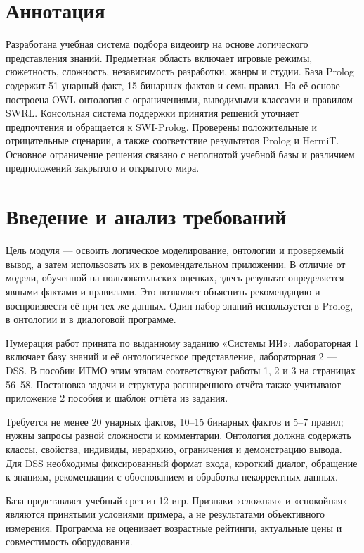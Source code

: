 \section{Аннотация}
Разработана учебная система подбора видеоигр на основе логического представления знаний.
Предметная область включает игровые режимы, сюжетность, сложность, независимость разработки,
жанры и студии. База Prolog содержит 51 унарный факт, 15 бинарных фактов и семь правил.
На её основе построена OWL-онтология с ограничениями, выводимыми классами и правилом SWRL.
Консольная система поддержки принятия решений уточняет предпочтения и обращается к SWI-Prolog.
Проверены положительные и отрицательные сценарии, а также соответствие результатов Prolog и HermiT.
Основное ограничение решения связано с неполнотой учебной базы и различием предположений
закрытого и открытого мира.

\section{Введение и анализ требований}
Цель модуля --- освоить логическое моделирование, онтологии и проверяемый вывод,
а затем использовать их в рекомендательном приложении. В отличие от модели,
обученной на пользовательских оценках, здесь результат определяется явными фактами
и правилами. Это позволяет объяснить рекомендацию и воспроизвести её при тех же данных.
Один набор знаний используется в Prolog, в онтологии и в диалоговой программе.

Нумерация работ принята по выданному заданию «Системы ИИ»: лабораторная 1 включает
базу знаний и её онтологическое представление, лабораторная 2 --- DSS.
В пособии ИТМО этим этапам соответствуют работы 1, 2 и 3 на страницах 56--58.
Постановка задачи и структура расширенного отчёта также учитывают приложение 2
пособия и шаблон отчёта из задания.

Требуется не менее 20 унарных фактов, 10--15 бинарных фактов и 5--7 правил;
нужны запросы разной сложности и комментарии. Онтология должна содержать классы,
свойства, индивиды, иерархию, ограничения и демонстрацию вывода.
Для DSS необходимы фиксированный формат входа, короткий диалог, обращение к знаниям,
рекомендации с обоснованием и обработка некорректных данных.

База представляет учебный срез из 12 игр. Признаки «сложная» и «спокойная»
являются принятыми условиями примера, а не результатами объективного измерения.
Программа не оценивает возрастные рейтинги, актуальные цены и совместимость оборудования.

